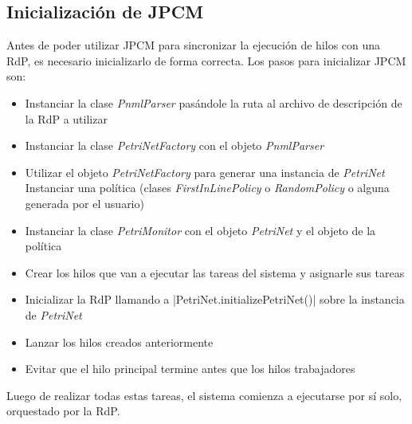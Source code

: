 \subsection{Inicialización de JPCM}
Antes de poder utilizar JPCM para sincronizar la ejecución de hilos con una
RdP, es necesario inicializarlo de forma correcta. Los pasos para inicializar
JPCM son:
\begin{itemize}
  \item Instanciar la clase \textit{PnmlParser} pasándole la ruta al archivo de
  descripción de la RdP a utilizar
  \item Instanciar la clase \textit{PetriNetFactory} con el objeto
  \textit{PnmlParser}
  \item Utilizar el objeto \textit{PetriNetFactory} para generar una instancia
  de \textit{PetriNet}
  \tem Instanciar una política (clases \textit{FirstInLinePolicy} o
  \textit{RandomPolicy} o alguna generada por el usuario)
  \item Instanciar la clase \textit{PetriMonitor} con el objeto
  \textit{PetriNet} y el objeto de la política
  \item Crear los hilos que van a ejecutar las tareas del sistema y asignarle
  sus tareas
  \item Inicializar la RdP llamando a |PetriNet.initializePetriNet()|
  sobre la instancia de \textit{PetriNet}
  \item Lanzar los hilos creados anteriormente
  \item Evitar que el hilo principal termine antes que los hilos trabajadores
\end{itemize}
 
Luego de realizar todas estas tareas, el sistema comienza a ejecutarse por sí
solo, orquestado por la RdP.

